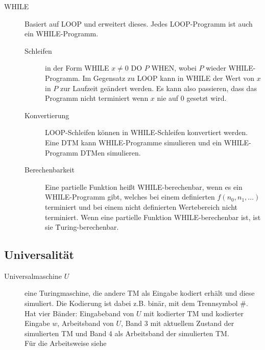 \begin{description}
        \item[WHILE] Basiert auf LOOP und erweitert dieses. Jedes LOOP-Programm ist auch ein WHILE-Programm.
            \begin{description}
                \item[Schleifen] in der Form WHILE $x \neq 0$ DO $P$ WHEN, wobei $P$ wieder WHILE-Programm. Im Gegensatz zu LOOP kann in WHILE der Wert von $x$ in $P$ zur Laufzeit geändert werden. Es kann also passieren, dass das Programm nicht terminiert wenn $x$ nie auf $0$ gesetzt wird.
                \item[Konvertierung] LOOP-Schleifen können in WHILE-Schleifen konvertiert werden. Eine DTM kann WHILE-Programme simulieren und ein WHILE-Programm DTMen simulieren.
                \item[Berechenbarkeit] Eine partielle Funktion heißt WHILE-berechenbar, wenn es ein WHILE-Programm gibt, welches bei einem definierten $f(n_0,n_1,…)$ terminiert und bei einem nicht definierten Wertebereich nicht terminiert. Wenn eine partielle Funktion WHILE-berechenbar ist, ist sie \f{Turing-berechenbar}.
            \end{description}
    \end{description}

\subsection{Universalität}
    \begin{description}
        \item[Universalmaschine $U$] eine Turingmaschine, die andere TM als Eingabe kodiert erhält und diese simuliert. Die Kodierung ist dabei z.B. binär, mit dem Trennsymbol $\#$. Hat vier Bänder: Eingabeband von $U$ mit kodierter TM und kodierter Eingabe $w$, Arbeitsband von $U$, Band 3 mit aktuellem Zustand der simulierten TM und Band 4 als Arbeitsband der simulierten TM. \\ Für die Arbeitsweise siehe 
    \end{description}

\newpage
